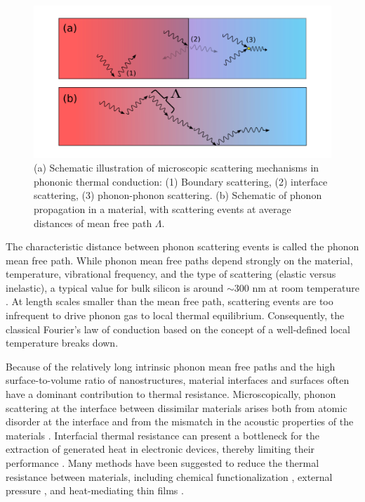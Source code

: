 \begin{figure}
\begin{center}
 \includegraphics[width=.99\columnwidth]{inkscape/scattering.pdf}
 \caption{(a) Schematic illustration of microscopic scattering mechanisms in phononic thermal conduction: (1) Boundary scattering, (2) interface scattering, (3) phonon-phonon scattering. (b) Schematic of phonon propagation in a material, with scattering events at average distances of mean free path $\Lambda$.}
\label{fig:intro_scattering}
\end{center}
\end{figure}

The characteristic distance between phonon scattering events is called the phonon mean free path. While phonon mean free paths depend strongly on the material, temperature, vibrational frequency, and the type of scattering (elastic versus inelastic), a typical value for bulk silicon is around $\sim 300$ nm at room temperature \cite{ju99}. At length scales smaller than the mean free path, scattering events are too infrequent to drive phonon gas to local thermal equilibrium. Consequently, the classical Fourier's law of conduction \cite{fourier} based on the concept of a well-defined local temperature breaks down. 

Because of the relatively long intrinsic phonon mean free paths and the high surface-to-volume ratio of nanostructures, material interfaces and surfaces often have a dominant contribution to thermal resistance. Microscopically, phonon scattering at the interface between dissimilar materials arises both from atomic disorder at the interface and from the mismatch in the acoustic properties of the materials \cite{khalatnikov52}. Interfacial thermal resistance can present a bottleneck for the extraction of generated heat in electronic devices, thereby limiting their performance \cite{pop10,moore14}. Many methods have been suggested to reduce the thermal resistance between materials, including chemical functionalization \cite{hopkins11,kaur14,han15b}, external pressure \cite{shen11,chalopin12}, and heat-mediating thin films \cite{english12}. 

